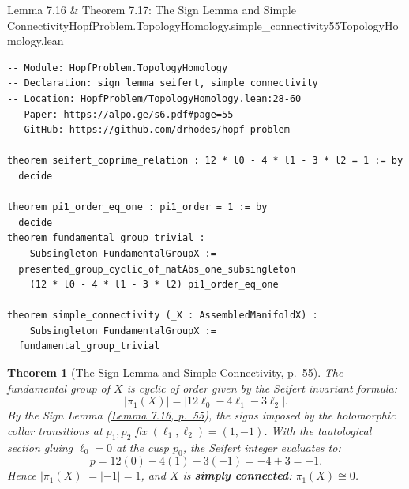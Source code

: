 \documentclass[10pt]{article}
\newtheorem{theorem}{Theorem}[section]
\gdef\hashchar{#}
\newcommand{\paperref}[2]{\href{https://alpo.ge/s6.pdf\hashchar page=#1}{#2}}
\begin{document}
\begin{comparativeblock}{Lemma 7.16 \& Theorem 7.17: The Sign Lemma and Simple Connectivity}{HopfProblem.TopologyHomology.simple_connectivity}{55}{TopologyHomology.lean}
\begin{verbatim}
-- Module: HopfProblem.TopologyHomology
-- Declaration: sign_lemma_seifert, simple_connectivity
-- Location: HopfProblem/TopologyHomology.lean:28-60
-- Paper: https://alpo.ge/s6.pdf#page=55
-- GitHub: https://github.com/drhodes/hopf-problem

theorem seifert_coprime_relation : 12 * l0 - 4 * l1 - 3 * l2 = 1 := by
  decide

theorem pi1_order_eq_one : pi1_order = 1 := by
  decide
theorem fundamental_group_trivial :
    Subsingleton FundamentalGroupX :=
  presented_group_cyclic_of_natAbs_one_subsingleton
    (12 * l0 - 4 * l1 - 3 * l2) pi1_order_eq_one

theorem simple_connectivity (_X : AssembledManifoldX) :
    Subsingleton FundamentalGroupX :=
  fundamental_group_trivial
\end{verbatim}
\tcblower
\begin{theorem}[\paperref{55}{The Sign Lemma and Simple Connectivity, p.~55}]\label{thm:sign-lemma-pi1}
The fundamental group of $X$ is cyclic of order given by the Seifert invariant formula:
\[
|\pi_1(X)| = \big| 12\ell_0 - 4\ell_1 - 3\ell_2 \big|.
\]
By the Sign Lemma (\paperref{55}{Lemma 7.16, p.~55}), the signs imposed by the holomorphic collar transitions at $p_1, p_2$ fix $(\ell_1, \ell_2) = (1, -1)$.
With the tautological section gluing $\ell_0 = 0$ at the cusp $p_0$, the Seifert integer evaluates to:
\[
p = 12(0) - 4(1) - 3(-1) = -4 + 3 = -1.
\]
Hence $|\pi_1(X)| = |-1| = 1$, and $X$ is \textbf{simply connected}: $\pi_1(X) \cong 0$.
\end{theorem}
\end{comparativeblock}
\end{document}
